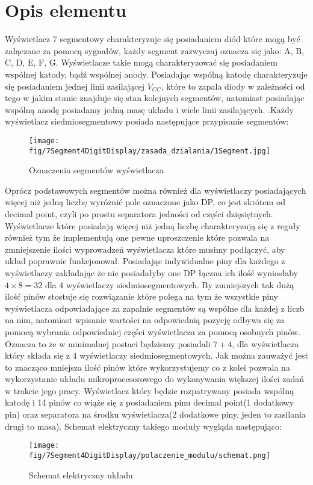 \documentclass[11pt, a4paper]{article}
\institute{Instytut Robotyki i Inteligencji Maszynowej}
\begin{document}
\newpage

\section*{Opis elementu} 
Wyświetlacz 7 segmentowy charakteryzuje się posiadaniem diód które mogą być załączane za pomocą sygnałów, każdy segment zazwyczaj oznacza się jako: A, B, C, D, E, F, G.
\newline
Wyświetlacze takie mogą charakteryzować się posiadaniem wspólnej katody, bądź wspólnej anody. Posiadając wspólną katodę charakteryzuje się posiadaniem jednej linii zasilającej $V_{CC}$, które to zapala diody w zależności od tego w jakim stanie znajduje się stan kolejnych segmentów, natomiast posiadając wspólną anodę posiadamy jedną masę układu i wiele linii zasilających. .Każdy wyświetlacz siedmiosegmentowy posiada następujące przypisanie segmentów:
\begin{figure}[H]
    \centering
    \texttt{[image: fig/7Segment4DigitDisplay/zasada\_dzialania/1Segment.jpg]}
    \caption{Oznaczenia segmentów wyświetlacza}
\end{figure}
Oprócz podstawowych segmentów można również dla wyświetlaczy posiadających więcej niż jedną liczbę wyróżnić pole oznaczone jako DP, co jest skrótem od decimal point, czyli po prostu separatora jedności od części dzięsiętnych. Wyświetlacze które posiadają więcej niż jedną liczbę charakteryzują się z reguły również tym że implementują one pewne uproszczenie które pozwala na zmniejszenie ilości wyprowadzeń wyświetlacza które musimy podłączyć, aby układ poprawnie funkcjonował. Posiadając indywidualne piny dla każdego z wyświetlaczy zakładając że nie posiadałyby one DP łączna ich ilość wyniosłaby $4\times8 = 32$ dla 4 wyświetlaczy siedmiosegmentowych. By zmniejszych tak dużą ilość pinów stostuje się rozwiązanie które polega na tym że wszystkie piny wyświetlacza odpowiadające za zapalnie segmentów są wspólne dla każdej z liczb na nim, natomiast wpisanie wartości na odpowiednią pozycję odbywa się za pomocą wybrania odpowiedniej części wyświetlacza za pomocą osobnych pinów. Oznacza to że w minimalnej postaci będziemy posiadali $7 + 4$, dla wyświetlacza który składa się z 4 wyświetlaczy siedmiosegmentowych. Jak można zauważyć jest to znacząco mniejsza ilość pinów które wykorzystujemy co z kolei pozwala na wykorzystanie układu mikroprocesorowego do wykonywania większej ilości zadań w trakcie jego pracy. Wyświetlacz który będzie rozpatrywany posiada wspólną katodę i 14 pinów co wiąże się z posiadaniem pinu decimal point(1 dodatkowy pin) oraz separatora na środku wyświetlacza(2 dodatkowe piny, jeden to zasilania drugi to masa). Schemat elektryczny takiego moduły wygląda następująco:
\begin{figure}[H]
    \centering
    \texttt{[image: fig/7Segment4DigitDisplay/polaczenie\_modulu/schemat.png]}
    \caption{Schemat elektryczny układu}
\end{figure}
\end{document}

